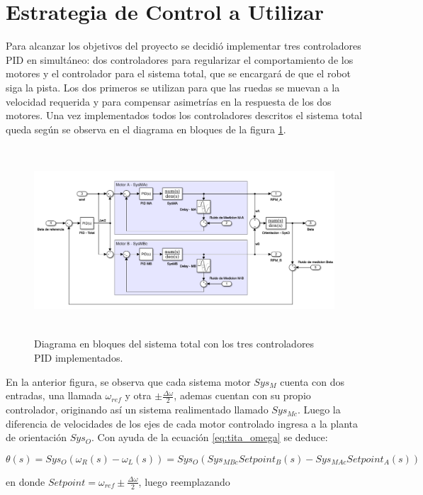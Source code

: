 \documentclass[10pt,conference,a4paper,onecolumn]{article}%
\begin{document}
\section{Estrategia de Control a Utilizar}
\label{sec:estrategia_de_control}
Para alcanzar los objetivos del proyecto se decidió implementar tres controladores PID en simultáneo: dos controladores para regularizar el comportamiento de los motores y el controlador para el sistema total, que se encargará de que el robot siga la pista. Los dos primeros se utilizan para que las ruedas se muevan a la velocidad requerida y para compensar asimetrías en la respuesta de los dos motores.
Una vez implementados todos los controladores descritos el sistema total queda según se observa en el diagrama en bloques de la figura \ref{diagra en bloques sist total}.
\begin{figure}[h]
\centering
\includegraphics[height=7cm]{./imagenes/sistema_total}
\caption{Diagrama en bloques del sistema total con los tres controladores PID implementados.}
\label{diagra en bloques sist total}
\end{figure}

En la anterior figura, se observa que cada sistema motor $Sys_M$ cuenta con dos entradas, una llamada $\omega_{ref}$ y otra $\pm \frac{\Delta \omega}{2}$, ademas cuentan con su propio controlador, originando así un sistema realimentado llamado $Sys_{Mc}$. Luego la diferencia de velocidades de los  ejes de cada motor controlado ingresa a la planta de orientación $Sys_O$. Con ayuda de la ecuación \ref{eq:tita_omega}  se deduce:

\begin{equation}
\theta(s)=Sys_O(\omega_R(s) - \omega_L(s))=Sys_O\left( Sys_{MBc} Setpoint_B(s) - Sys_{MAc} Setpoint_A(s)    \right)
\end{equation}

en donde $Setpoint = \omega_{ref} \pm \frac{\Delta \omega}{2}$, luego reemplazando
\end{document}
